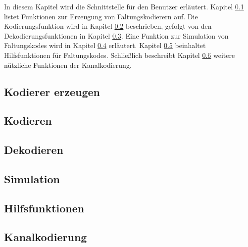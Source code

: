 
In diesem Kapitel wird die Schnittstelle für den Benutzer erläutert. Kapitel \ref{chapter:interface_kodierer_erzeugen} listet Funktionen zur Erzeugung von Faltungskodierern auf. Die Kodierungsfunktion wird in Kapitel \ref{chapter:interface_kodieren} beschrieben, gefolgt von den Dekodierungsfunktionen in Kapitel \ref{chapter:interface_dekodieren}. Eine Funktion zur Simulation von Faltungskodes wird in Kapitel \ref{chapter:interface_simulation} erläutert. Kapitel \ref{chapter:interface_hilfsfunktionen} beinhaltet Hilfsfunktionen für Faltungskodes. Schließlich beschreibt Kapitel \ref{chapter:interface_kanalkodierung} weitere nützliche Funktionen der Kanalkodierung.

\subsection{Kodierer erzeugen}
\label{chapter:interface_kodierer_erzeugen}




\subsection{Kodieren}
\label{chapter:interface_kodieren}


\subsection{Dekodieren}
\label{chapter:interface_dekodieren}




\subsection{Simulation}
\label{chapter:interface_simulation}


\subsection{Hilfsfunktionen}
\label{chapter:interface_hilfsfunktionen}




\subsection{Kanalkodierung}
\label{chapter:interface_kanalkodierung}




